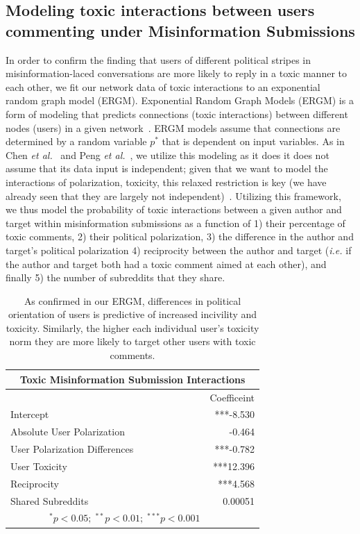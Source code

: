 \subsection{Modeling toxic interactions between users commenting under Misinformation Submissions}
In order to confirm the finding that users of different political stripes in misinformation-laced conversations are more likely to reply in a toxic manner to each other, we fit our network data of toxic interactions to an exponential random graph model (ERGM). Exponential Random Graph Models (ERGM) is a form of modeling that predicts connections (toxic interactions) between different nodes (users) in a given network~\cite{hunter2008ergm}. ERGM models assume that connections are determined by a random variable $p^*$ that is dependent on input variables. As in Chen \textit{et al.}~\cite{chen2022misleading} and Peng \textit{et al.}~\cite{peng2016follower}, we utilize this modeling as it does it does not assume that its data input is independent; given that we want to model the interactions of polarization, toxicity, this relaxed restriction is key (we have already seen that they are largely not independent)~\cite{van2019introduction,hunter2008ergm}. Utilizing this framework, we thus model the probability of toxic interactions between a given author and target within misinformation submissions as a function of 1) their percentage of toxic comments, 2) their political polarization, 3) the difference in the author and target's political polarization 4) reciprocity between the author and target (\textit{i.e.} if the author and target both had a toxic comment aimed at each other), and finally 5) the number of subreddits that they share. 
\begin{table}[b]
\centering
\begin{tabular}{lr}
\toprule
   \multicolumn{2}{c}{\large Toxic Misinformation Submission Interactions}          \\
   \toprule
   & Coefficeint \\
      \midrule
      Intercept               &***-8.530 \\               
      \midrule
     Absolute User Polarization       &         -0.464 \\
      \midrule
      User Polarization Differences     & ***-0.782 \\
    \midrule
       User Toxicity &   ***12.396\\
      \midrule
       Reciprocity &  ***4.568\\
      \midrule
       Shared Subreddits &  0.00051\\
\bottomrule
 $\quad\quad\quad\quad ^\ast p<0.05; \;  ^{**} p<0.01; \; ^{***}p<0.001$ \\
\end{tabular}
\caption{As confirmed in our ERGM, differences in political orientation of users is predictive of increased incivility and toxicity. Similarly, the higher each individual user's toxicity norm they are more likely to target other users with toxic comments. }
\label{tbl:ergm}
\end{table}

